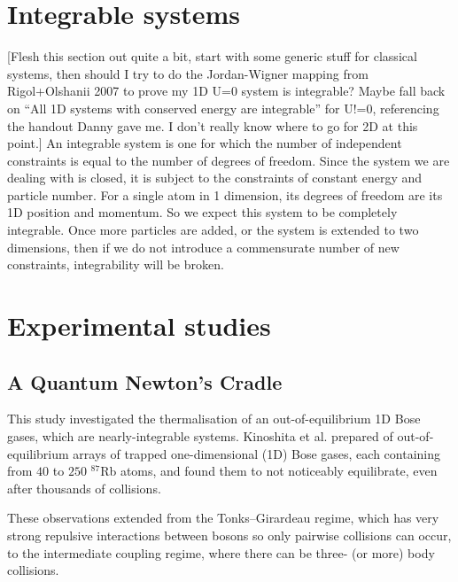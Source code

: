 \documentclass[a4paper,10pt]{article}
\begin{document}
\section{Integrable systems}
 [Flesh this section out quite a bit, start with some generic stuff for classical systems, then should I try to do the Jordan-Wigner mapping from Rigol+Olshanii 2007
to prove my 1D U=0 system is integrable? Maybe fall back on ``All 1D systems with conserved energy are integrable'' for U!=0, referencing the handout Danny gave me. I don't really know where 
to go for 2D at this point.]
An integrable system is one for which the number of independent constraints is equal to the number of degrees of freedom. Since the system we are dealing with
is closed, it is subject to the constraints of constant energy and particle number. For a single atom in 1 dimension, its degrees of freedom are its 1D position and momentum.
So we expect this system to be completely integrable. Once more particles are added, or the system is extended to two dimensions, then if we do not introduce a commensurate number
of new constraints, integrability will be broken.


\section{Experimental studies}
\subsection{A Quantum Newton's Cradle\cite{Kinoshita2006}}
This study investigated the thermalisation of an out-of-equilibrium 1D Bose gases, which are nearly-integrable systems. Kinoshita et al. prepared
of out-of-equilibrium arrays of trapped one-dimensional (1D) Bose gases, each containing from $40$ to $250$ $^{87}$Rb atoms, and found them to not noticeably equilibrate,
even after thousands of collisions. 

These observations extended from the Tonks–Girardeau regime, which has very strong repulsive interactions between bosons so only pairwise collisions can occur, to the intermediate 
coupling regime, where there can be three- (or more) body collisions. 
\end{document}
